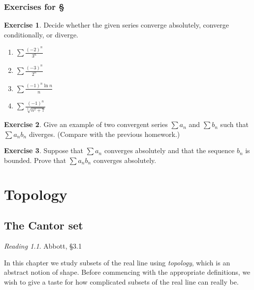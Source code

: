 \documentclass[11pt,oneside]{amsbook}
\theoremstyle{definition}
\newtheorem{exerc}{Exercise}[section]
\theoremstyle{plain}
\theoremstyle{definition}
\theoremstyle{remark}
\newtheorem*{reading}{Reading}
\numberwithin{equation}{section}
\numberwithin{figure}{section}
\begin{document}
\newpage
\subsection*{Exercises for \S \thesection}

\begin{exerc}
  Decide whether the given series converge absolutely, converge conditionally, or diverge.
  \begin{enumerate}
  \item $\displaystyle\sum\frac{(-2)^n}{3^n}$
  \item $\displaystyle\sum\frac{(-3)^n}{2^n}$
  \item $\displaystyle\sum\frac{(-1)^n\ln n}{n}$
  \item $\displaystyle\sum\frac{(-1)^n}{\sqrt[3]{n^2+7}}$
  \end{enumerate}
\end{exerc}

\begin{exerc}
  Give an example of two convergent series $\sum a_n$ and $\sum b_n$ such that $\sum a_nb_n$ diverges. (Compare with the previous homework.)
\end{exerc}

\begin{exerc}
  Suppose that $\sum a_n$ converges absolutely and that the sequence $b_n$ is bounded.  Prove that $\sum a_nb_n$ converges absolutely.
\end{exerc}


\chapter{Topology}

\section{The Cantor set}

\begin{reading}
  Abbott, \S 3.1
\end{reading}

In this chapter we study subsets of the real line using \emph{topology}, which is an abstract notion of shape. Before commencing with the appropriate definitions, we wish to give a taste for how complicated subsets of the real line can really be.
\end{document}
